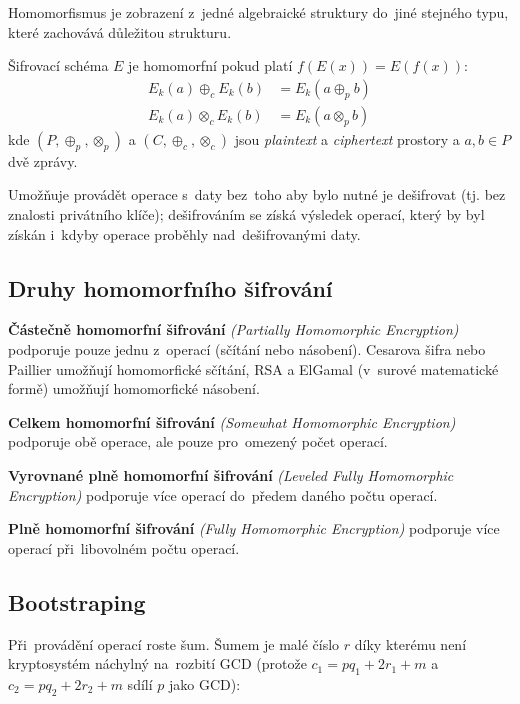 Homomorfismus je zobrazení z~jedné algebraické struktury do~jiné stejného typu, které zachovává důležitou strukturu.

Šifrovací schéma $E$ je homomorfní pokud platí $f(E(x)) = E(f(x))$:
\begin{align*}
    E_k(a) \oplus_c E_k(b) &= E_k (a \oplus_p b)
    \\
    E_k(a) \otimes_c E_k(b) &= E_k(a \otimes_p b)
\end{align*}
\noindent
kde $(P, \oplus_p, \otimes_p)$ a $(C, \oplus_c, \otimes_c)$ jsou \emph{plaintext} a \emph{ciphertext} prostory a $a, b \in P$ dvě zprávy.

Umožňuje provádět operace s~daty bez~toho aby bylo nutné je dešifrovat (tj. bez znalosti privátního klíče); dešifrováním se získá výsledek operací, který by byl získán i~kdyby operace proběhly nad~dešifrovanými daty.

\subsection{Druhy homomorfního šifrování}


\textbf{Částečně homomorfní šifrování} \emph{(Partially Homomorphic Encryption)} podporuje pouze jednu z~operací (sčítání nebo násobení).
Cesarova šifra nebo Paillier umožňují homomorfické sčítání, RSA a ElGamal (v~surové matematické formě) umožňují homomorfické násobení.

\textbf{Celkem homomorfní šifrování} \emph{(Somewhat Homomorphic Encryption)} podporuje obě operace, ale pouze pro~omezený počet operací.

\textbf{Vyrovnané plně homomorfní šifrování} \emph{(Leveled Fully Homomorphic Encryption)} podporuje více operací do~předem daného počtu operací.

\textbf{Plně homomorfní šifrování} \emph{(Fully Homomorphic Encryption)} podporuje více operací při~libovolném počtu operací.


\subsection{Bootstraping}

Při~provádění operací roste šum. Šumem je malé číslo $r$ díky kterému není kryptosystém náchylný na~rozbití GCD (protože $c_1 = pq_1 + 2r_1 + m$ a $c_2 = pq_2 + 2r_2 + m$ sdílí $p$ jako GCD):

